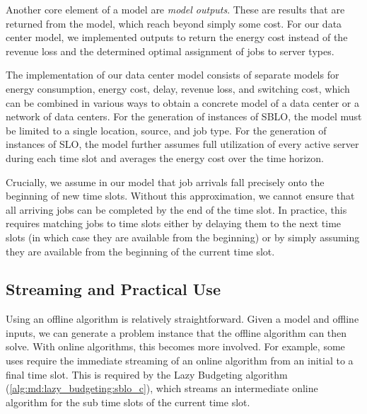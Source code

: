 Another core element of a model are \emph{model outputs}. These are results that are returned from the model, which reach beyond simply some cost. For our data center model, we implemented outputs to return the energy cost instead of the revenue loss and the determined optimal assignment of jobs to server types.

The implementation of our data center model consists of separate models for energy consumption, energy cost, delay, revenue loss, and switching cost, which can be combined in various ways to obtain a concrete model of a data center or a network of data centers. For the generation of instances of SBLO, the model must be limited to a single location, source, and job type. For the generation of instances of SLO, the model further assumes full utilization of every active server during each time slot and averages the energy cost over the time horizon.

Crucially, we assume in our model that job arrivals fall precisely onto the beginning of new time slots. Without this approximation, we cannot ensure that all arriving jobs can be completed by the end of the time slot. In practice, this requires matching jobs to time slots either by delaying them to the next time slots (in which case they are available from the beginning) or by simply assuming they are available from the beginning of the current time slot.

\subsection{Streaming and Practical Use}\label{section:implementation:architecture:streaming}

Using an offline algorithm is relatively straightforward. Given a model and offline inputs, we can generate a problem instance that the offline algorithm can then solve. With online algorithms, this becomes more involved. For example, some uses require the immediate streaming of an online algorithm from an initial to a final time slot. This is required by the Lazy Budgeting algorithm (\autoref{alg:md:lazy_budgeting:sblo_c}), which streams an intermediate online algorithm for the sub time slots of the current time slot.

